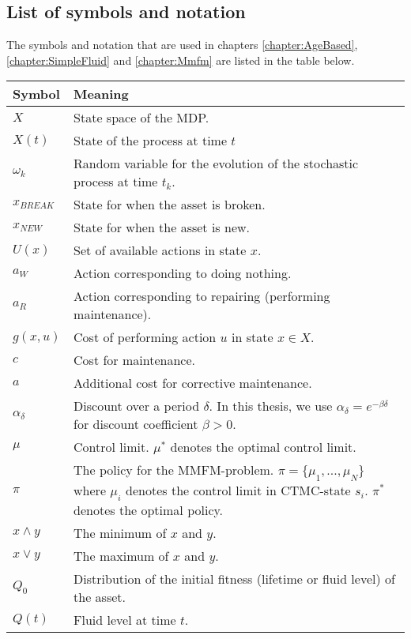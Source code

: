 \documentclass[a4paper]{thesis}
\theoremstyle{definition}
\begin{document}
\begin{appendices}
	\chapter{List of symbols and notation}\label{AppendixSymbolsAndNotation}
The symbols and notation that are used in chapters \ref{chapter:AgeBased}, \ref{chapter:SimpleFluid} and \ref{chapter:Mmfm} are listed in the table below.
	\begin{tabularx}{\linewidth}{l|L}\label{table:Symbols}
		Symbol        & Meaning         \\
		\hline                       
		$X$			& State space of the MDP. \\
		$X(t)$ & State of the process at time $t$ \\
		$\omega_k$ & Random variable for the evolution of the stochastic process at time $t_k$.\\   
		$x_{BREAK}$ & State for when the asset is broken.           \\
		$x_{NEW}$ & State for when the asset is new.\\   
		$U(x)$& Set of available actions in state $x$.\\
		$a_W$& Action corresponding to doing nothing.\\
		$a_R$& Action corresponding to repairing (performing maintenance). \\
		$g(x,u)$    & Cost of performing action $u$ in state $x\in X$.\\
		$c$& Cost for maintenance.\\
		$a$& Additional cost for corrective maintenance.\\
		$\alpha_\delta$ & Discount over a period $\delta$. In this thesis, we use $\alpha_\delta=e^{-\beta \delta}$ for discount coefficient $\beta>0$.\\       
		$\mu$ & Control limit. $\mu^*$ denotes the optimal control limit.\\
		$\pi$& The policy for the MMFM-problem. $\pi=\{\mu_1,...,\mu_N\}$ where $\mu_i$ denotes the control limit in CTMC-state $s_i$. $\pi^*$ denotes the optimal policy.\\
	    $x\wedge y$   & The minimum of $x$ and $y$.          \\       
        $x\vee y$     & The maximum of $x$ and $y$.\\
        $Q_0$ & Distribution of the initial fitness (lifetime or fluid level) of the asset.\\
        $Q(t)$& Fluid level at time $t$.\\

\end{tabularx}
\end{appendices}
\end{document}
